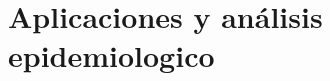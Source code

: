 \section{Aplicaciones y análisis epidemiologico}
\label{sec:cap2-aplicaciones-analisis-epidemiologico}

